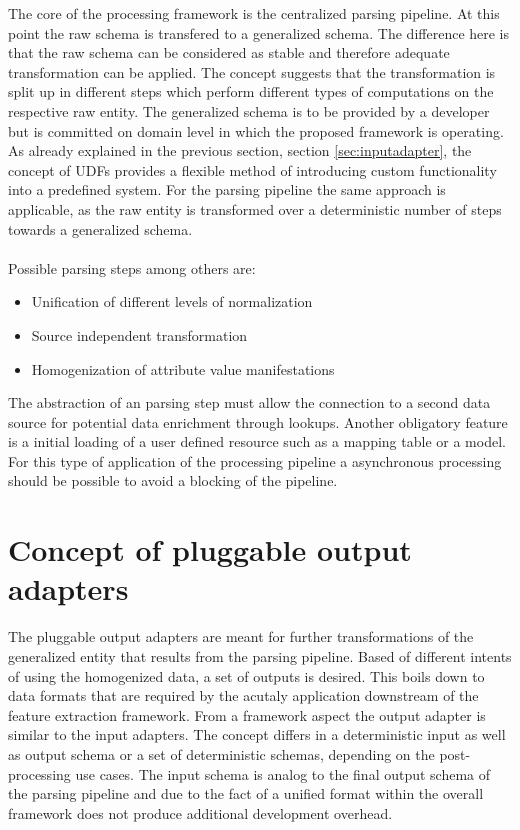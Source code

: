 The core of the processing framework is the centralized parsing pipeline. At this point the raw schema is transfered to a generalized schema. The difference here is that the raw schema can be considered as stable and therefore adequate transformation can be applied. The concept suggests that the transformation is split up in different steps which perform different types of computations on the respective raw entity. The generalized schema is to be provided by a developer but is committed on domain level in which the proposed framework is operating. As already explained in the previous section, section \ref{sec:inputadapter}, the concept of UDFs provides a flexible method of introducing custom functionality into a predefined system. For the parsing pipeline the same approach is applicable, as the raw entity is transformed over a deterministic number of steps towards a generalized schema. 
\\\\
Possible parsing steps among others are:
\begin{itemize}
\item Unification of different levels of normalization
\item Source independent transformation
\item Homogenization of attribute value manifestations
\end{itemize}

The abstraction of an parsing step must allow the connection to a second data source for potential data enrichment through lookups. Another obligatory feature is a initial loading of a user defined resource such as a mapping table or a model. For this type of application of the processing pipeline a asynchronous processing should be possible to avoid a blocking of the pipeline.

\section{Concept of pluggable output adapters}

The pluggable output adapters are meant for further transformations of the generalized entity that results from the parsing pipeline. Based of different intents of using the homogenized data, a set of outputs is desired. This boils down to data formats that are required by the acutaly application downstream of the feature extraction framework. From a framework aspect the output adapter is similar to the input adapters. The concept differs in a deterministic input as well as output schema or a set of deterministic schemas, depending on the post-processing use cases. The input schema is analog to the final output schema of the parsing pipeline and due to the fact of a unified format within the overall framework does not produce additional development overhead. 

